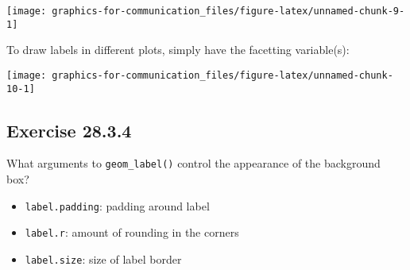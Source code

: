 \documentclass[]{book}
\newenvironment{Shaded}{\begin{snugshade}}{\end{snugshade}}
\newcommand{\DataTypeTok}[1]{\textcolor[rgb]{0.13,0.29,0.53}{#1}}
\newcommand{\DecValTok}[1]{\textcolor[rgb]{0.00,0.00,0.81}{#1}}
\newcommand{\KeywordTok}[1]{\textcolor[rgb]{0.13,0.29,0.53}{\textbf{#1}}}
\newcommand{\NormalTok}[1]{#1}
\newcommand{\OperatorTok}[1]{\textcolor[rgb]{0.81,0.36,0.00}{\textbf{#1}}}
\newcommand{\OtherTok}[1]{\textcolor[rgb]{0.56,0.35,0.01}{#1}}
\newcommand{\StringTok}[1]{\textcolor[rgb]{0.31,0.60,0.02}{#1}}
\providecommand{\tightlist}{%
  \setlength{\itemsep}{0pt}\setlength{\parskip}{0pt}}
\theoremstyle{plain}
\theoremstyle{remark}
\begin{document}
\begin{center}\texttt{[image: graphics-for-communication\_files/figure-latex/unnamed-chunk-9-1]} \end{center}

To draw labels in different plots, simply have the facetting
variable(s):

\begin{Shaded}
\end{Shaded}

\begin{center}\texttt{[image: graphics-for-communication\_files/figure-latex/unnamed-chunk-10-1]} \end{center}

\hypertarget{exercise-28.3.4}{%
\subsection*{\texorpdfstring{Exercise
{28.3.4}}{Exercise 28.3.4}}\label{exercise-28.3.4}}

What arguments to \texttt{geom\_label()} control the appearance of the
background box?

\begin{itemize}
\tightlist
\item
  \texttt{label.padding}: padding around label
\item
  \texttt{label.r}: amount of rounding in the corners
\item
  \texttt{label.size}: size of label border
\end{itemize}
\end{document}
